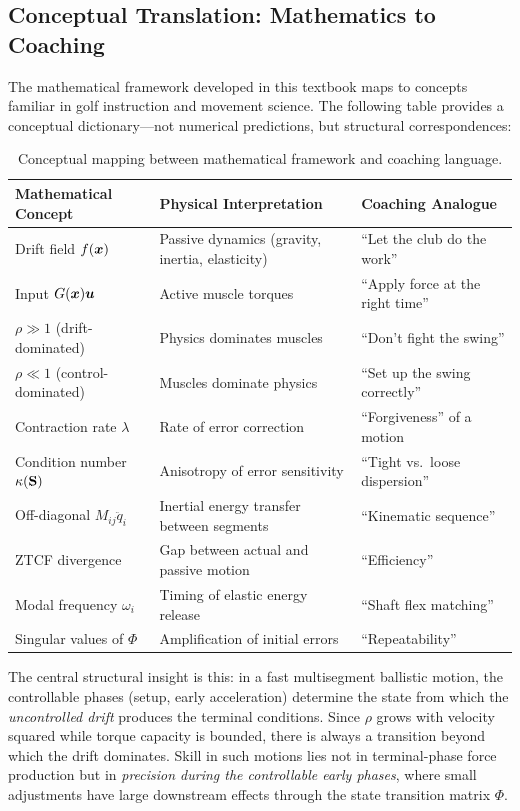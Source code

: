 \subsection{Conceptual Translation: Mathematics to Coaching}

The mathematical framework developed in this textbook maps to concepts familiar
in golf instruction and movement science. The following table provides a
conceptual dictionary---not numerical predictions, but structural correspondences:

\begin{table}[h]
\centering
\caption{Conceptual mapping between mathematical framework and coaching language.}
\label{tab:ch8:math-coaching}
\begin{tabular}{@{}p{4.5cm}p{5.5cm}p{4.5cm}@{}}
\toprule
\textbf{Mathematical Concept} & \textbf{Physical Interpretation} & \textbf{Coaching Analogue} \\
\midrule
Drift field $f(\bm{x})$ & Passive dynamics (gravity, inertia, elasticity) & ``Let the club do the work'' \\
Input $G(\bm{x})\bm{u}$ & Active muscle torques & ``Apply force at the right time'' \\
$\rho \gg 1$ (drift-dominated) & Physics dominates muscles & ``Don't fight the swing'' \\
$\rho \ll 1$ (control-dominated) & Muscles dominate physics & ``Set up the swing correctly'' \\
Contraction rate $\lambda$ & Rate of error correction & ``Forgiveness'' of a motion \\
Condition number $\kappa(\mathbf{S})$ & Anisotropy of error sensitivity & ``Tight vs.\ loose dispersion'' \\
Off-diagonal $M_{ij}\ddot{q}_i$ & Inertial energy transfer between segments & ``Kinematic sequence'' \\
ZTCF divergence & Gap between actual and passive motion & ``Efficiency'' \\
Modal frequency $\omega_i$ & Timing of elastic energy release & ``Shaft flex matching'' \\
Singular values of $\Phi$ & Amplification of initial errors & ``Repeatability'' \\
\bottomrule
\end{tabular}
\end{table}

\begin{intuitionbox}
The central structural insight is this: in a fast multisegment ballistic motion, the
controllable phases (setup, early acceleration) determine the state from which the
\emph{uncontrolled drift} produces the terminal conditions. Since $\rho$ grows with
velocity squared while torque capacity is bounded, there is always a transition
beyond which the drift dominates. Skill in such motions lies not in terminal-phase
force production but in \emph{precision during the controllable early phases}, where
small adjustments have large downstream effects through the state transition matrix $\Phi$.
\end{intuitionbox}

